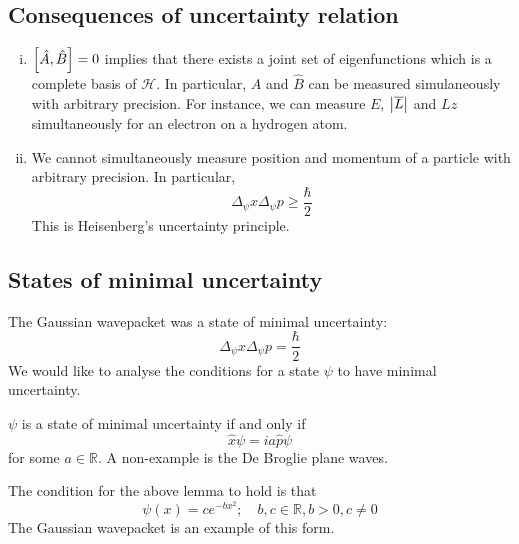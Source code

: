 \subsection{Consequences of uncertainty relation}
\begin{enumerate}[(i)]
	\item \( \qty[\hat A, \hat B] = 0 \) implies that there exists a joint set of eigenfunctions which is a complete basis of \( \mathcal H \).
	      In particular, \( \hat A \) and \( \hat B \) can be measured simulaneously with arbitrary precision.
	      For instance, we can measure \( E \), \( \abs{\overline L} \) and \( L z \) simultaneously for an electron on a hydrogen atom.
	\item We cannot simultaneously measure position and momentum of a particle with arbitrary precision.
	      In particular,
	      \[
		      \Delta_\psi x \Delta_\psi p \geq \frac{\hbar}{2}
	      \]
	      This is Heisenberg's uncertainty principle.
\end{enumerate}

\subsection{States of minimal uncertainty}
The Gaussian wavepacket was a state of minimal uncertainty:
\[
	\Delta_\psi x \Delta_\psi p = \frac{\hbar}{2}
\]
We would like to analyse the conditions for a state \( \psi \) to have minimal uncertainty.
\begin{lemma}
	\( \psi \) is a state of minimal uncertainty if and only if
	\[
		\hat x \psi = i a \hat p \psi
	\]
	for some \( a \in \mathbb R \).
	A non-example is the De Broglie plane waves.
\end{lemma}
\begin{lemma}
	The condition for the above lemma to hold is that
	\[
		\psi(x) = ce^{-bx^2};\quad b,c \in \mathbb R, b > 0, c \neq 0
	\]
	The Gaussian wavepacket is an example of this form.
\end{lemma}

